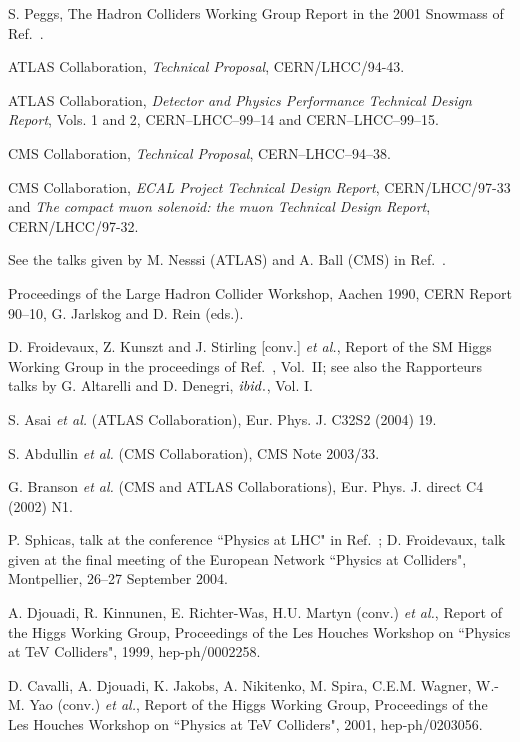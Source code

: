 \begin{thebibliography}{999}
 S. Peggs, The Hadron Colliders Working Group Report in the
2001 Snowmass of Ref.~\cite{Snowmass2001}.

 ATLAS Collaboration, {\it Technical Proposal},
 CERN/LHCC/94-43.

 ATLAS Collaboration, {\it Detector and Physics Performance
Technical Design Report}, 
Vols. 1 and 2, CERN--LHCC--99--14 and CERN--LHCC--99--15.

 CMS Collaboration, {\it Technical Proposal}, 
CERN--LHCC--94--38.

 CMS Collaboration, {\it ECAL Project Technical Design
Report}, CERN/LHCC/97-33 and {\it The compact muon solenoid: the muon 
Technical Design Report}, CERN/LHCC/97-32. 

 See the talks given by M. Nesssi (ATLAS) and
A. Ball (CMS) in Ref.~\cite{Vienna}. 

 Proceedings of the Large Hadron Collider Workshop, 
Aachen 1990, CERN Report 90--10, G. Jarlskog and D. Rein (eds.). 

 D. Froidevaux, Z. Kunszt and J. Stirling [conv.] {\it et 
al.}, Report of the SM Higgs Working Group in the proceedings of 
Ref.~\cite{HiggsLHC}, Vol.~II;  see also the Rapporteurs talks by G. Altarelli 
and D. Denegri, ${\it ibid.}$, Vol. I.

 S. Asai {\it et al.} (ATLAS Collaboration), Eur. Phys. 
J. C32S2 (2004) 19. 

 S. Abdullin {\it et al.} (CMS Collaboration), CMS Note 2003/33. 

 G. Branson {\it et al.} (CMS and ATLAS Collaborations), 
Eur. Phys. J. direct C4 (2002) N1. 

 P. Sphicas, talk at the conference ``Physics at LHC" in 
Ref.~\cite{Vienna}; D. Froidevaux, talk given at the final meeting of the
European Network ``Physics at Colliders", Montpellier, 26--27 September 2004.

A. Djouadi, R. Kinnunen, E. Richter-Was, H.U. Martyn (conv.) {\it et al.}, 
Report of the Higgs Working Group, Proceedings of the Les Houches Workshop 
on ``Physics at TeV Colliders", 1999, hep-ph/0002258. 

 D. Cavalli, A. Djouadi, K. Jakobs, A. Nikitenko, M. Spira, C.E.M. Wagner, 
W.-M. Yao (conv.) {\it et al.}, Report of the Higgs Working Group,
Proceedings of the Les Houches Workshop on ``Physics at 
TeV Colliders", 2001, hep-ph/0203056. 


\end{thebibliography}
